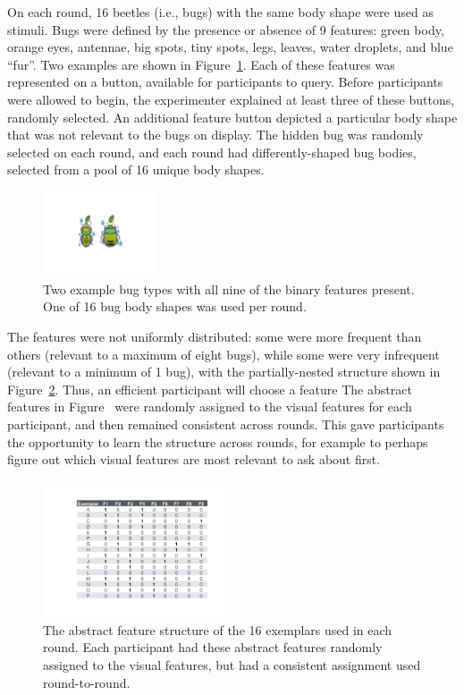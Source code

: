 \documentclass[10pt,letterpaper]{article}
\begin{document}
On each round, 16 beetles (i.e., bugs) with the same body shape were used as stimuli. Bugs were defined by the presence or absence of 9 features: green body, orange eyes, antennae, big spots, tiny spots, legs, leaves, water droplets, and blue ``fur''. Two examples are shown in Figure~\ref{fig:example_bugs}. Each of these features was represented on a button, available for participants to query. Before participants were allowed to begin, the experimenter explained at least three of these buttons, randomly selected. An additional feature button depicted a particular body shape that was not relevant to the bugs on display. The hidden bug was randomly selected on each round, and each round had differently-shaped bug bodies, selected from a pool of 16 unique body shapes.

\begin{figure}[!h]
  \centering
  \includegraphics[width=0.3\textwidth]{figures/example_bugs}
  \caption{Two example bug types with all nine of the binary features present. One of 16 bug body shapes was used per round.}
  \label{fig:example_bugs}
\end{figure} 

The features were not uniformly distributed: some were more frequent than others (relevant to a maximum of eight bugs), while some were very infrequent (relevant to a minimum of 1 bug), with the partially-nested structure shown in Figure~\ref{fig:feature_table}. Thus, an efficient participant will choose a feature  The abstract features in Figure~ were randomly assigned to the visual features for each participant, and then remained consistent across rounds. This gave participants the opportunity to learn the structure across rounds, for example to perhaps figure out which visual features are most relevant to ask about first.

\begin{figure}[!h]
  \centering
  \includegraphics[width=0.48\textwidth]{figures/feature_table}
  \caption{The abstract feature structure of the 16 exemplars used in each round. Each participant had these abstract features randomly assigned to the visual features, but had a consistent assignment used round-to-round.}
  \label{fig:feature_table}
\end{figure} 
\end{document}
